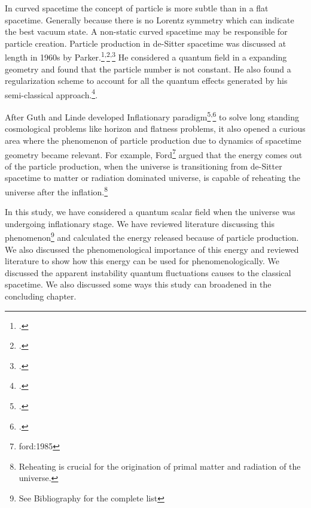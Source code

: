 In curved spacetime the concept of particle is more subtle than in a flat spacetime. Generally because there is no Lorentz symmetry which can indicate the best vacuum state. A non-static curved spacetime may be responsible for particle creation. Particle production in de-Sitter spacetime was discussed at length in 1960s by Parker.\footcite{parker:1968}\textsuperscript{,}\footcite{parker:1969}\textsuperscript{,}\footcite{parker:1971} He considered a quantum field in a expanding geometry and found that the particle number is not constant. He also found a regularization scheme to account for all the quantum effects generated by his semi-classical approach.\footcite[His personal account of his work on particle creation can consulted for further illumination][]{parker:2012}.

After Guth and Linde developed Inflationary paradigm\footcite{Guth:1980}\textsuperscript{,}\footcite{Linde:1984} to solve long standing cosmological problems like horizon and flatness problems, it also opened a curious area where the phenomenon of particle production due to dynamics of spacetime geometry became relevant. For example, Ford\footnote{ford:1985} argued that the energy comes out of the particle production, when the universe is transitioning from de-Sitter spacetime to matter or radiation dominated universe, is capable of reheating the universe after the inflation.\footnote{Reheating is crucial for the origination of primal matter and radiation of the universe.}

In this study, we have considered a quantum scalar field when the universe was undergoing inflationary stage. We have reviewed literature discussing this phenomenon\footnote{See Bibliography for the complete list} and calculated the energy released because of particle production. We also discussed the phenomenological importance of this energy and reviewed literature to show how this energy can be used for phenomenologically. We discussed the apparent instability quantum fluctuations causes to the classical spacetime. We also discussed some ways this study can broadened in the concluding chapter.